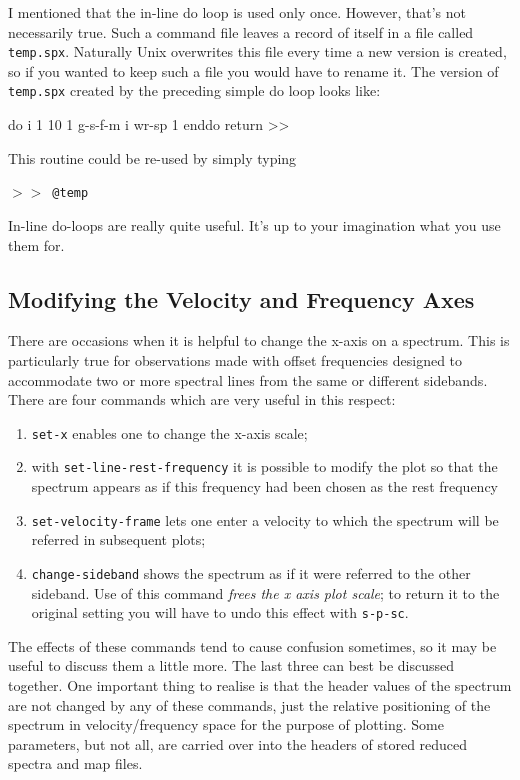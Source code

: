 \documentclass[11pt,twoside]{starlink}
\providecommand{\SP}{{$>\!>$}}
\begin{document}
I mentioned that the in-line do loop is used only once. However,
that's not necessarily true. Such a command file leaves a record of
itself in a file called \texttt{temp.spx}. Naturally Unix overwrites this
file every time a new version is created, so if you wanted to keep
such a file you would have to rename it. The version of \texttt{temp.spx}
created by the preceding simple do loop looks like:

\begin{terminalv}
 do i                   1   10    1
 g-s-f-m i
 wr-sp 1
 enddo
 return
 >>
\end{terminalv}
This routine could be re-used by simply typing

\SP\ \verb|@temp|

In-line do-loops are really quite useful. It's up to your imagination
what you use them for.


\subsection{Modifying the Velocity and Frequency Axes}
\label{sec:modifying-axes}
There are occasions when it is helpful to change the x-axis on a
spectrum. This is particularly true for observations made with offset
frequencies designed to accommodate two or more spectral lines from
the same or different sidebands. There are four commands which are
very useful in this respect:
\begin{enumerate}
\item
\verb|set-x| enables one to change the x-axis scale;
\item
with \verb|set-line-rest-frequency| it is possible to modify the plot
so that the spectrum appears as if this frequency had been chosen as
the rest frequency
\item
\verb|set-velocity-frame| lets one enter a velocity to which the
spectrum will be referred in subsequent plots;
\item
\verb|change-sideband| shows the spectrum as if it were referred to
the other sideband. Use of this command \textit{frees the x axis plot
scale}; to return it to the original setting you will have to undo
this effect with \texttt{s-p-sc}.
\end{enumerate}
The effects of these commands tend to cause confusion sometimes, so it
may be useful to discuss them a little more. The last three can best
be discussed together.  One important thing to realise is that the
header values of the spectrum are not changed by any of these
commands, just the relative positioning of the spectrum in
velocity/frequency space for the purpose of plotting. Some parameters,
but not all, are carried over into the headers of stored reduced
spectra and map files.
\end{document}
